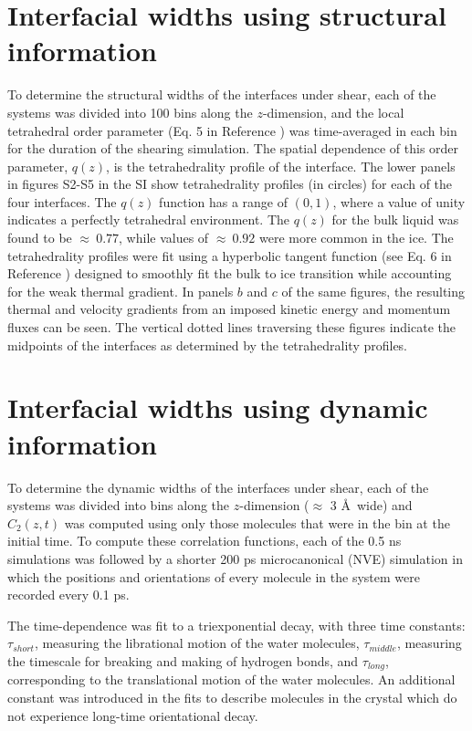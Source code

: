 \documentclass{pnastwo}
\begin{document}
\begin{article}
\section{Interfacial widths using structural information}
To determine the structural widths of the interfaces under shear, each
of the systems was divided into 100 bins along the $z$-dimension, and
the local tetrahedral order parameter (Eq. 5 in Reference
\citealp{Louden13}) was time-averaged in each bin for the duration of
the shearing simulation.  The spatial dependence of this order
parameter, $q(z)$, is the tetrahedrality profile of the interface.
The lower panels in figures S2-S5 in the SI show tetrahedrality
profiles (in circles) for each of the four interfaces.  The $q(z)$
function has a range of $(0,1)$, where a value of unity indicates a
perfectly tetrahedral environment.  The $q(z)$ for the bulk liquid was
found to be $\approx~0.77$, while values of $\approx~0.92$ were more
common in the ice. The tetrahedrality profiles were fit using a
hyperbolic tangent function (see Eq. 6 in Reference
\citealp{Louden13}) designed to smoothly fit the bulk to ice
transition while accounting for the weak thermal gradient. In panels
$b$ and $c$ of the same figures, the resulting thermal and velocity
gradients from an imposed kinetic energy and momentum fluxes can be
seen. The vertical dotted lines traversing these figures indicate the
midpoints of the interfaces as determined by the tetrahedrality
profiles.

\section{Interfacial widths using dynamic information}
To determine the dynamic widths of the interfaces under shear, each of
the systems was divided into bins along the $z$-dimension ($\approx$ 3
\AA\ wide) and $C_2(z,t)$ was computed using only those molecules that
were in the bin at the initial time.  To compute these correlation
functions, each of the 0.5 ns simulations was followed by a shorter
200 ps microcanonical (NVE) simulation in which the positions and
orientations of every molecule in the system were recorded every 0.1
ps. 

The time-dependence was fit to a triexponential decay, with three time
constants: $\tau_{short}$, measuring the librational motion of the
water molecules, $\tau_{middle}$, measuring the timescale for breaking
and making of hydrogen bonds, and $\tau_{long}$, corresponding to the
translational motion of the water molecules.  An additional constant
was introduced in the fits to describe molecules in the crystal which
do not experience long-time orientational decay.


\end{article}
\end{document}
